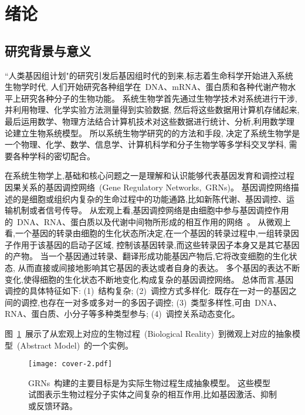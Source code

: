 \section{绪论}
\subsection{研究背景与意义}

``人类基因组计划"的研究引发后基因组时代的到来,标志着生命科学开始进入系统生物学时代,
人们开始研究各种组学在~DNA、mRNA、蛋白质和各种代谢产物水平上研究各种分子的生物功能。
系统生物学首先通过生物学技术对系统进行干涉,并利用物理、化学实验方法测量得到实验数据,
然后将这些数据用计算机存储起来,最后运用数学、物理方法结合计算机技术对这些数据进行统计、分析,利用数学理论建立生物系统模型。
所以系统生物学研究的的方法和手段,
决定了系统生物学是一个物理、化学、数学、信息学、计算机科学和分子生物学等多学科交叉学科,
需要各种学科的密切配合\cite{ideker2001new}。

在系统生物学上,基础和核心问题之一是理解和认识能够代表基因发育和调控过程因果关系的基因调控网络~(Gene Regulatory Networks,~GRNs)。
基因调控网络描述的是细胞或组织内复杂的生命过程中的功能通路,比如新陈代谢、基因调控、运输机制或者信号传导。
从宏观上看,基因调控网络是由细胞中参与基因调控作用的~DNA、RNA、蛋白质以及代谢中间物所形成的相互作用的网络~\cite{de2002modeling}。
从微观上看,一个基因的转录由细胞的生化状态所决定,在一个基因的转录过程中,一组转录因子作用于该基因的启动子区域,
控制该基因转录,而这些转录因子本身又是其它基因的产物。
当一个基因通过转录、翻译形成功能基因产物后,它将改变细胞的生化状态,
从而直接或间接地影响其它基因的表达或者自身的表达。
多个基因的表达不断变化,使得细胞的生化状态不断地变化,构成复杂的基因调控网络。
总体而言,基因调控的具体特征如下: 
(1)~结构复杂;
(2)~调控方式多样化:~既存在一对一的基因之间的调控,也存在一对多或多对一的多因子调控;
(3)~类型多样性,可由~DNA、RNA、蛋白质、小分子等多种类型参与;
(4)~调控关系动态变化。

图~\ref{cover-2}~展示了从宏观上对应的生物过程~(Biological Reality)~到微观上对应的抽象模型~(Abstract Model)~的一个实例。
\begin{figure}[!htbp]
    \centering
    \texttt{[image: cover-2.pdf]}
    \caption{GRNs~构建的主要目标是为实际生物过程生成抽象模型。
    这些模型试图表示生物过程分子实体之间复杂的相互作用,比如基因激活、抑制或反馈环路。
    }
    \label{cover-2}
\end{figure}

